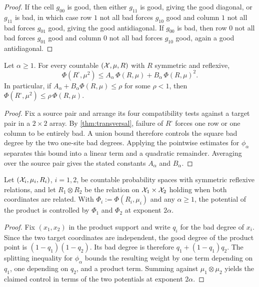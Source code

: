 \begin{proof}
\leanok
If the cell $g_{00}$ is good, then either $g_{11}$ is good, giving the good diagonal, or
$g_{11}$ is bad, in which case row $1$ not all bad forces $g_{10}$ good and column $1$ not
all bad forces $g_{01}$ good, giving the good antidiagonal. If $g_{00}$ is bad, then row
$0$ not all bad forces $g_{01}$ good and column $0$ not all bad forces $g_{10}$ good, again
a good antidiagonal.
\end{proof}

\begin{lemma}
\label{thm:contraction}
\leanok
{}
Let $\alpha\geq1$. For every countable $(\mathcal{X},\mu,R)$ with $R$ symmetric and reflexive,
\[
 \Phi(R^\square,\mu^2)\leq A_\alpha\,\Phi(R,\mu)+B_\alpha\,\Phi(R,\mu)^2 .
\]
In particular, if $A_\alpha+B_\alpha\Phi(R,\mu)\leq\rho$ for some $\rho<1$, then
$\Phi(R^\square,\mu^2)\leq\rho\,\Phi(R,\mu)$.
\end{lemma}

\begin{proof}
\leanok
{}
Fix a source pair and arrange its four compatibility tests against a target pair in a
$2\times2$ array. By \cref{thm:transversal}, failure of $R^\square$ forces one row or one
column to be entirely bad. A union bound therefore controls the square bad degree by the two
one-site bad degrees. Applying the pointwise estimates for $\phi_\alpha$ separates this bound
into a linear term and a quadratic remainder. Averaging over the source pair gives the stated
constants $A_\alpha$ and $B_\alpha$.
\end{proof}

\begin{lemma}
\label{thm:product}
\leanok
{}
Let $(\mathcal{X}_i,\mu_i,R_i)$, $i=1,2$, be countable probability spaces with symmetric reflexive
relations, and let $R_1\otimes R_2$ be the relation on $\mathcal{X}_1\times\mathcal{X}_2$ holding when both
coordinates are related. With $\Phi_i:=\Phi(R_i,\mu_i)$ and any $\alpha\geq1$, the
potential of the product is controlled by $\Phi_1$ and $\Phi_2$ at exponent $2\alpha$.
\end{lemma}

\begin{proof}
\leanok
{}
Fix $(x_1,x_2)$ in the product support and write $q_i$ for the bad degree of $x_i$. Since the
two target coordinates are independent, the good degree of the product point is
$(1-q_1)(1-q_2)$. Its bad degree is therefore
$q_1+(1-q_1)q_2$. The splitting inequality for $\phi_\alpha$ bounds the resulting weight by
one term depending on $q_1$, one depending on $q_2$, and a product term. Summing against
$\mu_1\otimes\mu_2$ yields the claimed control in terms of the two potentials at exponent
$2\alpha$.
\end{proof}

